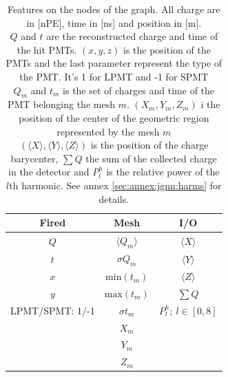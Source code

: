 \documentclass[../main.tex]{subfiles}
\begin{document}
\begin{table}[ht]
  \centering
  \begin{tabular}{|c|c|c|}
    \hline
    Fired & Mesh & I/O \\
    \hline \hline
    $Q$ & $\langle Q_m \rangle$ & $\langle X \rangle$ \\
    $t$ & $\sigma Q_m$ & $\langle Y \rangle$ \\
    $x$ & $\mathrm{min}(t_m)$ & $\langle Z \rangle$ \\
    $y$ & $\mathrm{max}(t_m)$ & $\sum Q$ \\
    LPMT/SPMT: 1/-1 & $\sigma t_m$ & $P^h_l; ~ l \in [0,8]$ \\
            & $X_m$ & \\
             & $Y_m$ & \\
             & $Z_m$ & \\
    \hline
  \end{tabular}
  \caption{Features on the nodes of the graph. All charge are in [nPE], time in [ns] and position in [m]. \\
  $Q$ and $t$ are the reconstructed charge and time of the hit PMTs. $(x,y,z)$ is the position of the PMTs and the last parameter represent the type of the PMT. It's 1 for LPMT and -1 for SPMT \\
  $Q_m$ and $t_m$ is the set of charges and time of the PMT belonging the mesh $m$. $(X_m, Y_m, Z_m)$ i the position of the center of the geometric region represented by the mesh $m$ \\
  $(\langle X \rangle, \langle Y \rangle, \langle Z \rangle)$ is the position of the charge barycenter, $\sum Q$ the sum of the collected charge in the detector and $P^h_l$ is the relative power of the $l$th harmonic. See annex \ref{sec:annex:jgnn:harms} for details.}
  \label{tab:jgnn:node_feat}
\end{table}
\end{document}
